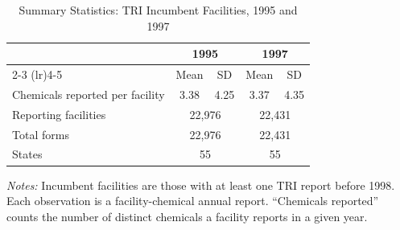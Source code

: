 \begin{table}[H]
\centering
\caption{Summary Statistics: TRI Incumbent Facilities, 1995 and 1997}
\label{tab:summary}
\begin{threeparttable}
\begin{tabular}{lcccc}
\toprule
 & \multicolumn{2}{c}{1995} & \multicolumn{2}{c}{1997} \\
\cmidrule(lr){2-3} \cmidrule(lr){4-5}
 & Mean & SD & Mean & SD \\
\midrule
Chemicals reported per facility & 3.38 & 4.25 & 3.37 & 4.35 \\
Reporting facilities & \multicolumn{2}{c}{22,976} & \multicolumn{2}{c}{22,431} \\
Total forms & \multicolumn{2}{c}{22,976} & \multicolumn{2}{c}{22,431} \\
States & \multicolumn{2}{c}{55} & \multicolumn{2}{c}{55} \\
\bottomrule
\end{tabular}
\begin{tablenotes}[flushleft]
\small
\item \textit{Notes:} Incumbent facilities are those with at least one TRI report before 1998. Each observation is a facility-chemical annual report. ``Chemicals reported'' counts the number of distinct chemicals a facility reports in a given year.
\end{tablenotes}
\end{threeparttable}
\end{table}
